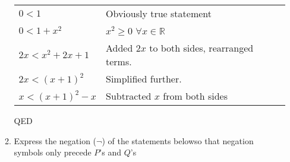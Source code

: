 \documentclass[a4paper,11pt]{article}
\begin{document}
\begin{enumerate}
\begin{enumerate}
\begin{tabular}{l | l}
 $0 < 1$                 & Obviously true statement \\
 $0 < 1 + x^2$           & $x^2 \geq 0$  $\forall x \in \mathbb{R}$ \\
 $2x < x^2 + 2x + 1$     & Added $2x$ to both sides, rearranged terms. \\
 $2x < (x+1)^2$          & Simplified further. \\
 $x < (x+1)^2 - x$       & Subtracted $x$ from both sides
\end{tabular}

QED



\item Express the negation ($\neg$) of the statements belowso that negation symbols only precede $P$'s and $Q$'s

\end{enumerate}



\end{enumerate}
\end{document}
